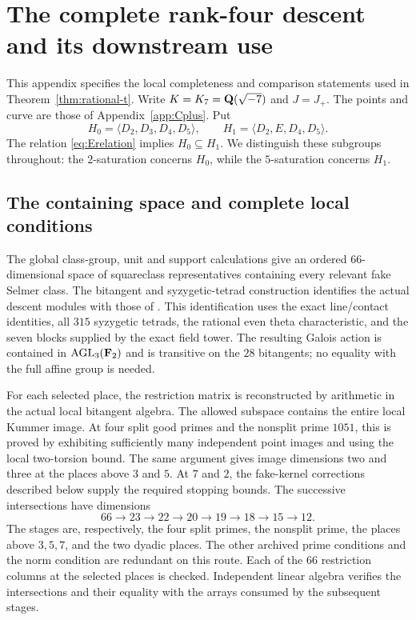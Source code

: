 \section{The complete rank-four descent and its downstream use}
\label{app:rank-proof}

This appendix specifies the local completeness and comparison statements
used in Theorem~\ref{thm:rational-t}.  Write $K=K_7=\mathbf Q(\sqrt{-7})$ and
$J=J_+$.  The points and curve are those of Appendix~\ref{app:Cplus}.
Put
\[
 H_0=\langle D_2,D_3,D_4,D_5\rangle,\qquad
 H_1=\langle D_2,E,D_4,D_5\rangle.
\]
The relation \eqref{eq:Erelation} implies $H_0\subseteq H_1$.
We distinguish these subgroups throughout: the $2$-saturation concerns
$H_0$, while the $5$-saturation concerns $H_1$.

\subsection{The containing space and complete local conditions}

The global class-group, unit and support calculations give an ordered
$66$-dimensional space of squareclass representatives containing every
relevant fake Selmer class.  The bitangent and syzygetic-tetrad construction
identifies the actual descent modules with those of
\cite[Corollary~12.5 and Appendix~A]{BPS}.  This identification uses the
exact line/contact identities, all $315$ syzygetic tetrads, the rational
even theta characteristic, and the seven blocks supplied by the exact
field tower.  The resulting Galois action is contained in
$\operatorname{AGL}_3(\mathbf F_2)$ and is transitive on the $28$ bitangents;
no equality with the full affine group is needed.

For each selected place, the restriction matrix is reconstructed by
arithmetic in the actual local bitangent algebra.  The allowed subspace
contains the entire local Kummer image.  At four split good primes and the
nonsplit prime $1051$, this is proved by exhibiting sufficiently many
independent point images and using the local two-torsion bound.  The same
argument gives image dimensions two and three at the places above $3$ and
$5$.  At $7$ and $2$, the fake-kernel corrections described below supply
the required stopping bounds.  The successive intersections have dimensions
\begin{equation}\label{eq:rank-dimensions}
 66\longrightarrow23\longrightarrow22\longrightarrow20
 \longrightarrow19\longrightarrow18\longrightarrow15\longrightarrow12.
\end{equation}
The stages are, respectively, the four split primes, the nonsplit prime,
the places above $3,5,7$, and the two dyadic places.  The other archived
prime conditions and the norm condition are redundant on this route.
Each of the $66$ restriction columns at the selected places is checked.
Independent linear algebra verifies the intersections and their equality
with the arrays consumed by the subsequent stages.

